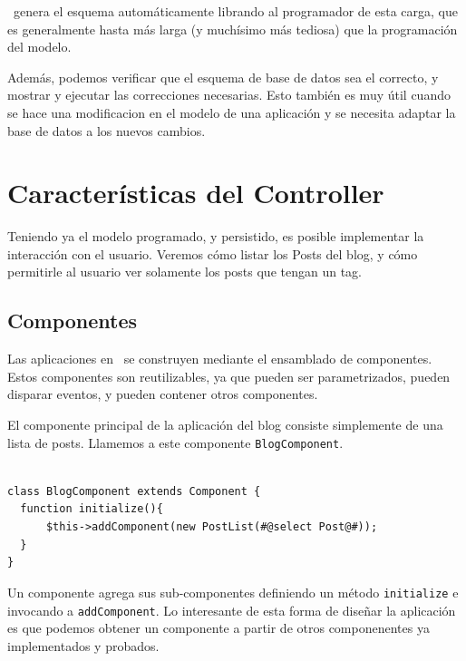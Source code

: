 \PWB \ genera el esquema automáticamente librando al programador de esta carga, que es generalmente hasta más larga (y muchísimo más tediosa) que la programación del modelo.

Además, podemos verificar que el esquema de base de datos sea el correcto, y mostrar y ejecutar las correcciones necesarias. Esto también es muy útil cuando se hace una modificacion en el modelo de una aplicación y se necesita adaptar la base de datos a los nuevos cambios.

\section{Características del Controller}

Teniendo ya el modelo programado, y persistido, es posible implementar la interacción con el usuario. Veremos cómo listar los Posts del blog, y cómo permitirle al usuario ver solamente los posts que tengan un tag.

\label{sec-controller}
\subsection{Componentes}
\label{sub-comp}

Las aplicaciones en \PWB\ se construyen mediante el ensamblado de componentes. Estos componentes son reutilizables, ya que pueden ser parametrizados, pueden disparar eventos, y pueden contener otros componentes.

El componente principal de la aplicación del blog consiste simplemente de una lista de posts. Llamemos a este componente \verb"BlogComponent".

\begin{verbatim}

class BlogComponent extends Component {
  function initialize(){
      $this->addComponent(new PostList(#@select Post@#));
  }
}
\end{verbatim}

Un componente agrega sus sub-componentes definiendo un método \verb"initialize" e invocando a \verb"addComponent". Lo interesante de esta forma de diseñar la aplicación es que podemos obtener un componente a partir de otros componenentes ya implementados y probados.


